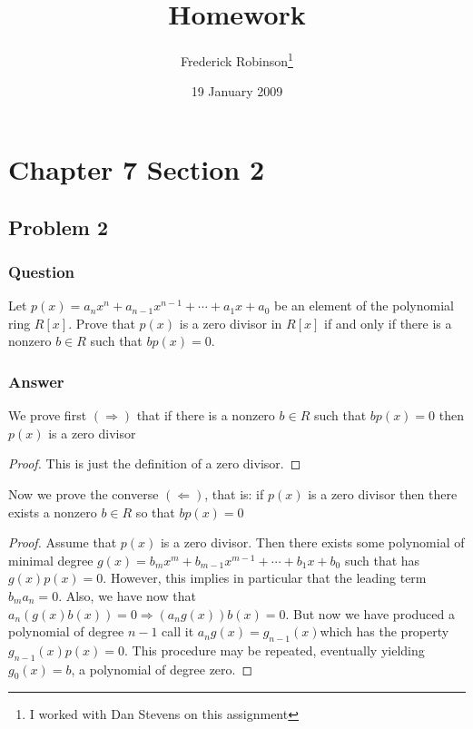 \documentclass[12pt]{article}
\title{Homework}
\author{Frederick Robinson\footnote{I worked with Dan Stevens on this assignment}}
\date{19 January 2009}
\begin{document}

   \maketitle

\setcounter{tocdepth}{2} 

\tableofcontents

\section{Chapter 7 Section 2}
\subsection{Problem 2}

\subsubsection{Question}
Let $p(x) = a_n x^n + a_{n-1}x^{n-1} + \cdots+a_1x+a_0$ be an element of the polynomial ring $R[x]$. Prove that $p(x)$ is a zero divisor in $R[x]$ if and only if there is a nonzero $b\in R$ such that $b p (x)=0$.

\subsubsection{Answer}
We prove first $(\Rightarrow)$ that if there is a nonzero $b\in R$ such that $bp(x)=0$ then $p(x)$ is a zero divisor

\begin{proof}
This is just the definition of a zero divisor. 
\end{proof}

Now we prove the converse $(\Leftarrow)$, that is: if $p(x)$ is a zero divisor then there exists a nonzero $b \in R$ so that $b p (x) = 0$

\begin{proof}
Assume that $p(x)$ is a zero divisor. Then there exists some polynomial of minimal degree $g(x)=b_m x^m + b_{m-1}x^{m-1} + \cdots + b_1 x +  b_0$ such that has $g(x) p(x) = 0$. However, this implies in particular that the leading term  $b_m a_n = 0$. Also, we have now that $a_n(g(x)b(x))=0 \Rightarrow (a_n g(x))b(x)=0$. But now we have produced a polynomial of degree $n-1$ call it $a_n g(x)=g_{n-1}(x)$which has the property $g_{n-1}(x) p(x)=0$. This procedure may be repeated, eventually yielding $g_{0}(x)=b$, a polynomial of degree zero.
\end{proof}
\end{document}
